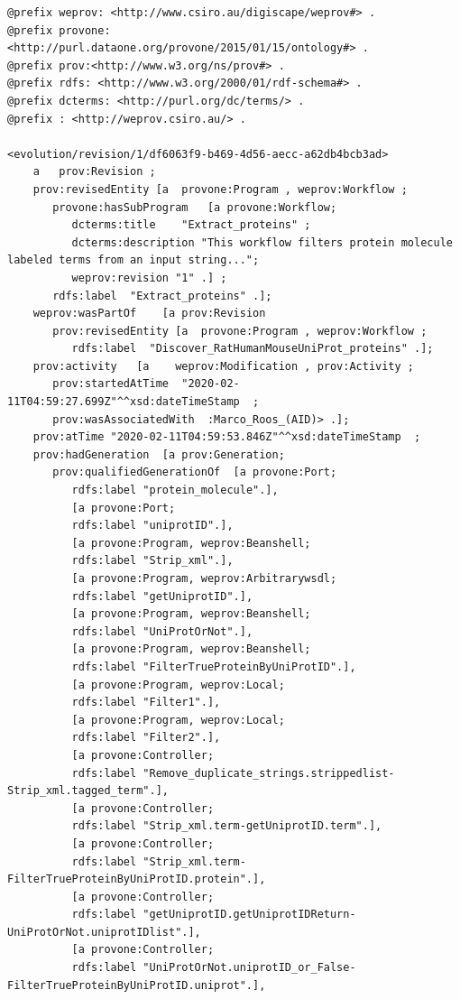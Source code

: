 \documentclass[ao]{iosart2x}
\begin{document}
\begin{lstlisting}[frame=single, caption={Extract\_Proteins workflow revision provenance},label={lst:modification-prov}]
@prefix weprov: <http://www.csiro.au/digiscape/weprov#> .
@prefix provone: <http://purl.dataone.org/provone/2015/01/15/ontology#> .
@prefix prov:<http://www.w3.org/ns/prov#> .
@prefix rdfs: <http://www.w3.org/2000/01/rdf-schema#> .
@prefix dcterms: <http://purl.org/dc/terms/> .
@prefix : <http://weprov.csiro.au/> .

<evolution/revision/1/df6063f9-b469-4d56-aecc-a62db4bcb3ad>
    a   prov:Revision ;
    prov:revisedEntity [a  provone:Program , weprov:Workflow ;
       provone:hasSubProgram   [a provone:Workflow;
          dcterms:title    "Extract_proteins" ;
          dcterms:description "This workflow filters protein molecule labeled terms from an input string...";
          weprov:revision "1" .] ;
       rdfs:label  "Extract_proteins" .];
    weprov:wasPartOf    [a prov:Revision
       prov:revisedEntity [a  provone:Program , weprov:Workflow ;
          rdfs:label  "Discover_RatHumanMouseUniProt_proteins" .];
    prov:activity   [a    weprov:Modification , prov:Activity ;
       prov:startedAtTime  "2020-02-11T04:59:27.699Z"^^xsd:dateTimeStamp  ;
       prov:wasAssociatedWith  :Marco_Roos_(AID)> .];
    prov:atTime "2020-02-11T04:59:53.846Z"^^xsd:dateTimeStamp  ;
    prov:hadGeneration  [a prov:Generation;
       prov:qualifiedGenerationOf  [a provone:Port;
          rdfs:label "protein_molecule".],
          [a provone:Port;
          rdfs:label "uniprotID".],
          [a provone:Program, weprov:Beanshell;
          rdfs:label "Strip_xml".],
          [a provone:Program, weprov:Arbitrarywsdl;
          rdfs:label "getUniprotID".],
          [a provone:Program, weprov:Beanshell;
          rdfs:label "UniProtOrNot".],
          [a provone:Program, weprov:Beanshell;
          rdfs:label "FilterTrueProteinByUniProtID".],
          [a provone:Program, weprov:Local;
          rdfs:label "Filter1".],
          [a provone:Program, weprov:Local;
          rdfs:label "Filter2".],
          [a provone:Controller;
          rdfs:label "Remove_duplicate_strings.strippedlist-Strip_xml.tagged_term".],
          [a provone:Controller;
          rdfs:label "Strip_xml.term-getUniprotID.term".],
          [a provone:Controller;
          rdfs:label "Strip_xml.term-FilterTrueProteinByUniProtID.protein".],
          [a provone:Controller;
          rdfs:label "getUniprotID.getUniprotIDReturn-UniProtOrNot.uniprotIDlist".],
          [a provone:Controller;
          rdfs:label "UniProtOrNot.uniprotID_or_False-FilterTrueProteinByUniProtID.uniprot".],

\end{lstlisting}
\end{document}
